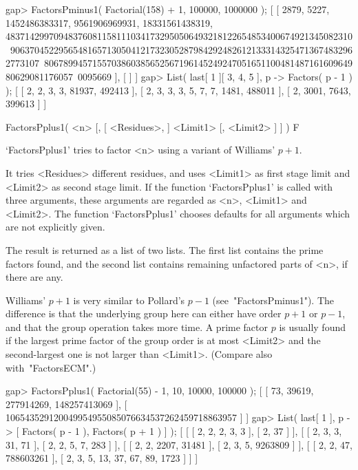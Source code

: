 \beginexample
gap> FactorsPminus1( Factorial(158) + 1, 100000, 1000000 );
[ [ 2879, 5227, 1452486383317, 9561906969931, 18331561438319, 
      483714299709483760811581110341732950506493218122654853400674921345082310\
906370452295654816571305041217323052879842924826121333143254713674832962773107\
806789945715570386038565256719614524924705165110048148716160964980629081176057\
0095669 ], [  ] ]
gap> List( last[ 1 ]{[ 3, 4, 5 ]}, p -> Factors( p - 1 ) );
[ [ 2, 2, 3, 3, 81937, 492413 ], [ 2, 3, 3, 3, 5, 7, 7, 1481, 488011 ], 
  [ 2, 3001, 7643, 399613 ] ]
\endexample


\>FactorsPplus1( <n> [, [ <Residues>, ] <Limit1> [, <Limit2> ] ] ) F

`FactorsPplus1' tries to factor <n> using a variant of Williams' $p+1$.

It tries <Residues> different residues, and uses <Limit1>
as first stage limit and <Limit2> as second stage limit.
If the function `FactorsPplus1' is called with three arguments,
these arguments are regarded as <n>, <Limit1> and <Limit2>.
The function `FactorsPplus1' chooses defaults for all arguments
which are not explicitly given.

The result is returned as a list of two lists. The first list
contains the prime factors found, and the second list contains
remaining unfactored parts of <n>, if there are any.

Williams' $p+1$ is very similar to Pollard's $p-1$
(see~"FactorsPminus1"). The difference is that the underlying group
here can either have order $p+1$ or $p-1$, and that the group
operation takes more time.
A prime factor $p$ is usually found if the largest prime factor
of the group order is at most <Limit2> and the second-largest one is
not larger than <Limit1>. (Compare also with~"FactorsECM".)

\beginexample
gap> FactorsPplus1( Factorial(55) - 1, 10, 10000, 100000 );
[ [ 73, 39619, 277914269, 148257413069 ], 
  [ 106543529120049954955085076634537262459718863957 ] ]
gap> List( last[ 1 ], p -> [ Factors( p - 1 ), Factors( p + 1 ) ] );
[ [ [ 2, 2, 2, 3, 3 ], [ 2, 37 ] ], 
  [ [ 2, 3, 3, 31, 71 ], [ 2, 2, 5, 7, 283 ] ], 
  [ [ 2, 2, 2207, 31481 ], [ 2, 3, 5, 9263809 ] ], 
  [ [ 2, 2, 47, 788603261 ], [ 2, 3, 5, 13, 37, 67, 89, 1723 ] ] ]
\endexample


